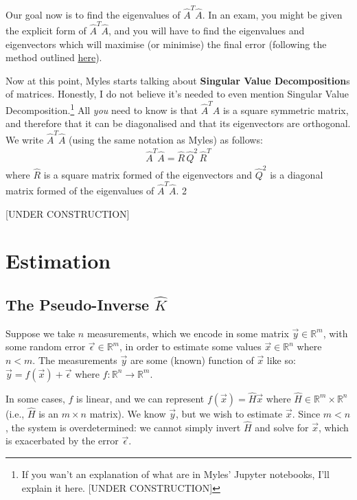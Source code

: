 Our goal now is to find the eigenvalues of $\hat{A}^T\hat{A}$. In an exam, you might be given the explicit form of $\hat{A}^T\hat{A}$, and you will have to find the eigenvalues and eigenvectors which will maximise (or minimise) the final error (following the method outlined \hyperref[Lin Alg]{here}). 

Now at this point, Myles starts talking about \textbf{Singular Value Decomposition}s of matrices. Honestly, I do not believe it's needed to even mention Singular Value Decomposition.\footnote{
    If you wan't an explanation of what are in Myles' Jupyter notebooks, I'll explain it here. [UNDER CONSTRUCTION]
} All \textit{you} need to know is that $\hat{A}^T\hat{A}$ is a square symmetric matrix, and therefore that it can be diagonalised and that its eigenvectors are orthogonal. We write $\hat{A}^T\hat{A}$ (using the same notation as Myles) as follows:
\begin{align*}
    \hat{A}^T\hat{A} = \hat{R}\,\hat{Q}^2\,\hat{R}^{T}
\end{align*}
where $\hat{R}$ is a square matrix formed of the eigenvectors and $\hat{Q}^2$ is a diagonal matrix formed of the eigenvalues of $\hat{A}^T\hat{A}$. 2

[UNDER CONSTRUCTION]

\chapter{Estimation}\label{Estimation}

\section{The Pseudo-Inverse \texorpdfstring{$\hat{K}$}{K-hat}}

Suppose we take $n$ measurements, which we encode in some matrix $\vec{y}\in\mathbb{R}^m$, with some random error $\vec{\epsilon}\in\mathbb{R}^m$, in order to estimate some values $\vec{x}\in\mathbb{R}^n$ where $n<m$. The measurements $\vec{y}$ are some (known) function of $\vec{x}$ like so: $\vec{y}=f(\vec{x})+\vec{\epsilon}$ where $f:\mathbb{R}^n\to\mathbb{R}^m$.

In some cases, $f$ is linear, and we can represent $f(\vec{x})=\hat{H}\vec{x}$ where $\hat{H}\in\mathbb{R}^m\times\mathbb{R}^n$ (i.e., $\hat{H}$ is an $m\times n$ matrix). We know $\vec{y}$, but we wish to estimate $\vec{x}$. Since $m<n$, the system is overdetermined: we cannot simply invert $\hat{H}$ and solve for $\vec{x}$, which is exacerbated by the error $\vec{\epsilon}$.

